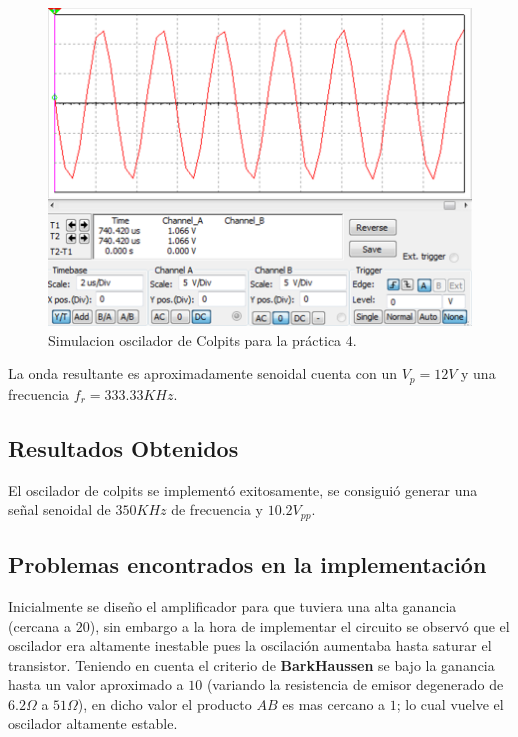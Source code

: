 \documentclass[11pt,graphicx,caption,rotating]{article}
\begin{document}
\begin{figure}[H]
	\centering
		\includegraphics[scale=0.35]{simulation_lab_4.png}
	\caption{Simulacion oscilador de Colpits para la práctica $4$.}
	\label{fig15}
\end{figure}
\noindent
La onda resultante es aproximadamente senoidal cuenta con un $V_p = 12 V$ y una frecuencia $f_r= 333.33 KHz$.

\subsection{Resultados Obtenidos}
\noindent
El oscilador de colpits se implementó exitosamente, se consiguió generar una señal senoidal de $350 KHz$ de frecuencia y $10.2 V_{pp}$.

\subsection{Problemas encontrados en la implementación}
\noindent
Inicialmente se diseño el amplificador para que tuviera una alta ganancia (cercana a $20$), sin embargo a la hora de implementar el circuito se observó que el oscilador era altamente inestable pues la oscilación aumentaba hasta saturar el transistor. Teniendo en cuenta el criterio de \textbf{BarkHaussen} se bajo la ganancia hasta un valor aproximado a $10$ (variando la resistencia de emisor degenerado de $6.2 \Omega$ a $51 \Omega$), en dicho valor el producto $AB$ es mas cercano a $1$; lo cual vuelve el oscilador altamente estable.
\end{document}
